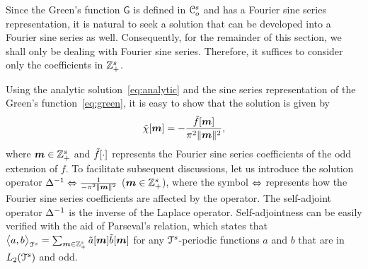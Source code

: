 Since the Green's function $\mathsf{G}$ is defined in $\mathcal{C}_o^s$ and has a Fourier sine series representation, it is natural to seek a solution that can be developed into a Fourier sine series as well. 
Consequently, for the remainder of this section, we shall only be dealing with Fourier sine series. 
Therefore, it suffices to consider only the coefficients in $\mathbb{Z}^s_+$.

Using the analytic solution~\eqref{eq:analytic} and the sine series representation of the Green's function~\eqref{eq:green}, it is easy to show that the solution is given by
\begin{equation}
  \st{\chi}[\vect{m}] = -
  \frac{\st{f}[\vect{m}]}{\pi^2 \norm{\vect{m}}^2},
\label{eq:fourierSolution}
\end{equation}
where $\boldsymbol{m} \in \mathbb{Z}^s_+$ and $\tilde{f}[\cdot]$ represents the Fourier  sine series coefficients of the odd extension of $f$. 
To facilitate subsequent discussions, let us introduce the solution operator $\mathop{\Delta^{-1}} \Leftrightarrow \frac{1}{-\pi^2 \lVert\boldsymbol{m}\rVert^2}$  ($\boldsymbol{m} \in
\mathbb{Z}^s_+$), where the symbol $\Leftrightarrow$ represents how the Fourier sine
series coefficients are affected by the operator.
The self-adjoint operator $\mathop{\Delta^{-1}}$ is the inverse of the Laplace operator. 
Self-adjointness can be easily verified with the aid of Parseval's relation, which states that
$
  \bigl \langle a , b \bigr \rangle_{\mathcal{T}^s} = \sum_{\boldsymbol{m} \in \mathbb{Z}^s_+} \tilde{a}[\boldsymbol{m}]
  \tilde{b}[\boldsymbol{m}] 
$
for any $\mathcal{T}^s$-periodic functions $a$ and $b$ that are in $L_2(\mathcal{T}^s)$ and odd.



